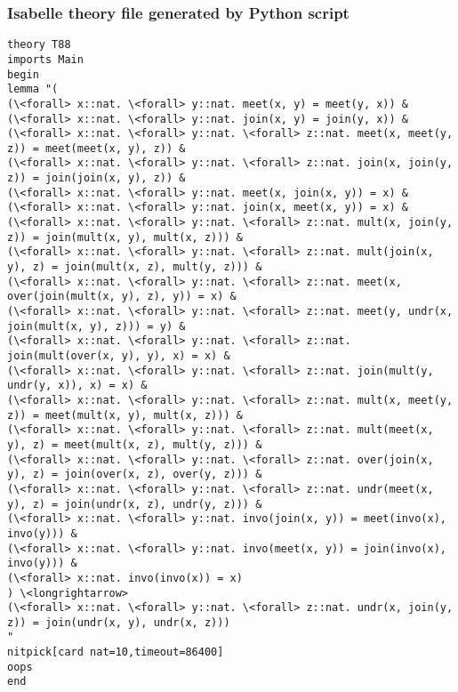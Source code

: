 \documentclass{beamer}
\begin{document}
\begin{frame}[fragile]
\frametitle{Isabelle theory file generated by Python script}
\fontsize{6pt}{0.0}\selectfont
\begin{verbatim}
theory T88
imports Main
begin
lemma "(
(\<forall> x::nat. \<forall> y::nat. meet(x, y) = meet(y, x)) &
(\<forall> x::nat. \<forall> y::nat. join(x, y) = join(y, x)) &
(\<forall> x::nat. \<forall> y::nat. \<forall> z::nat. meet(x, meet(y, z)) = meet(meet(x, y), z)) &
(\<forall> x::nat. \<forall> y::nat. \<forall> z::nat. join(x, join(y, z)) = join(join(x, y), z)) &
(\<forall> x::nat. \<forall> y::nat. meet(x, join(x, y)) = x) &
(\<forall> x::nat. \<forall> y::nat. join(x, meet(x, y)) = x) &
(\<forall> x::nat. \<forall> y::nat. \<forall> z::nat. mult(x, join(y, z)) = join(mult(x, y), mult(x, z))) &
(\<forall> x::nat. \<forall> y::nat. \<forall> z::nat. mult(join(x, y), z) = join(mult(x, z), mult(y, z))) &
(\<forall> x::nat. \<forall> y::nat. \<forall> z::nat. meet(x, over(join(mult(x, y), z), y)) = x) &
(\<forall> x::nat. \<forall> y::nat. \<forall> z::nat. meet(y, undr(x, join(mult(x, y), z))) = y) &
(\<forall> x::nat. \<forall> y::nat. \<forall> z::nat. join(mult(over(x, y), y), x) = x) &
(\<forall> x::nat. \<forall> y::nat. \<forall> z::nat. join(mult(y, undr(y, x)), x) = x) &
(\<forall> x::nat. \<forall> y::nat. \<forall> z::nat. mult(x, meet(y, z)) = meet(mult(x, y), mult(x, z))) &
(\<forall> x::nat. \<forall> y::nat. \<forall> z::nat. mult(meet(x, y), z) = meet(mult(x, z), mult(y, z))) &
(\<forall> x::nat. \<forall> y::nat. \<forall> z::nat. over(join(x, y), z) = join(over(x, z), over(y, z))) &
(\<forall> x::nat. \<forall> y::nat. \<forall> z::nat. undr(meet(x, y), z) = join(undr(x, z), undr(y, z))) &
(\<forall> x::nat. \<forall> y::nat. invo(join(x, y)) = meet(invo(x), invo(y))) &
(\<forall> x::nat. \<forall> y::nat. invo(meet(x, y)) = join(invo(x), invo(y))) &
(\<forall> x::nat. invo(invo(x)) = x)
) \<longrightarrow>
(\<forall> x::nat. \<forall> y::nat. \<forall> z::nat. undr(x, join(y, z)) = join(undr(x, y), undr(x, z)))
"
nitpick[card nat=10,timeout=86400]
oops
end
\end{verbatim}
\end{frame}  
\end{document}
